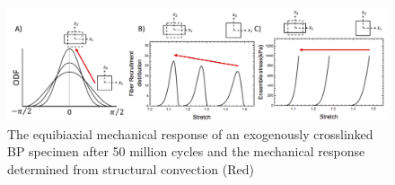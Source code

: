 \begin{figure}[hbt]
\centering
\includegraphics[width=0.35\paperwidth]{Images/chapter4/figure10}
\caption{The equibiaxial mechanical response of an exogenously crosslinked BP specimen after 50 million cycles and the mechanical response determined from structural convection (Red)}
\label{fig:mechconvec}
\end{figure}



